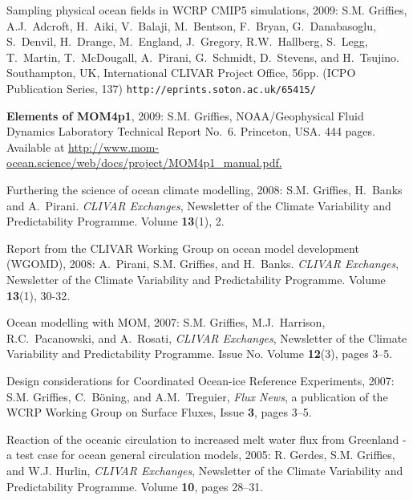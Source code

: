 \begin{etaremune}
\item Sampling physical ocean fields in WCRP CMIP5 simulations, 2009: S.M. Grif\/f\/ies, A.J.\ Adcroft, H.\ Aiki, V.\ Balaji, M.\ Bentson, F.\ Bryan, G.\ Danabasoglu, S.\ Denvil, H.\ Drange, M.\ England, J.\ Gregory, R.W.\ Hallberg, S.\ Legg, T.\ Martin, T.\ McDougall, A.\ Pirani, G.\ Schmidt, D.\ Stevens, and H.\ Tsujino. Southampton, UK, International CLIVAR Project Office, 56pp. (ICPO
  Publication Series, 137) {\tt http://eprints.soton.ac.uk/65415/}

\item {\bf Elements of MOM4p1}, 2009: S.M. Grif\/f\/ies,
  NOAA/Geophysical Fluid Dynamics Laboratory Technical Report No.\ 6. Princeton, USA.  444 pages.  Available at \href{http://www.mom-ocean.science/web/docs/project/MOM4p1_manual.pdf}{http://www.mom-ocean.science/web/docs/project/MOM4p1\_manual.pdf.}
  
\item Furthering the science of ocean climate modelling, 2008: S.M. Grif\/f\/ies, H.\ Banks and A.\ Pirani.  {\em CLIVAR Exchanges}, Newsletter of the Climate Variability and Predictability Programme.  Volume {\bf 13}(1), 2.

\item Report from the CLIVAR Working Group on ocean model development (WGOMD), 2008: A.\ Pirani, S.M. Grif\/f\/ies, and H.\ Banks. {\em CLIVAR Exchanges}, Newsletter of the Climate Variability and Predictability Programme.  Volume {\bf 13}(1), 30-32.

\item Ocean modelling with MOM, 2007: S.M. Grif\/f\/ies, M.J.\ Harrison, R.C.\ Pacanowski, and A.\ Rosati, {\em CLIVAR Exchanges}, Newsletter of the Climate Variability and Predictability Programme. Issue No. Volume {\bf 12}(3), pages 3--5.

\item Design considerations for Coordinated Ocean-ice Reference Experiments, 2007: S.M. Grif\/f\/ies, C.\ B\"oning, and A.M.\ Treguier, {\em Flux News}, a publication of the WCRP Working Group on Surface Fluxes, Issue {\bf 3}, pages 3--5.

\item Reaction of the oceanic circulation to increased melt water flux from Greenland - a test case for ocean general circulation models, 2005: R. Gerdes, S.M. Grif\/f\/ies, and W.J. Hurlin, {\em CLIVAR Exchanges}, Newsletter of the Climate Variability and Predictability Programme.  Volume {\bf 10}, pages 28--31.


\end{etaremune}
